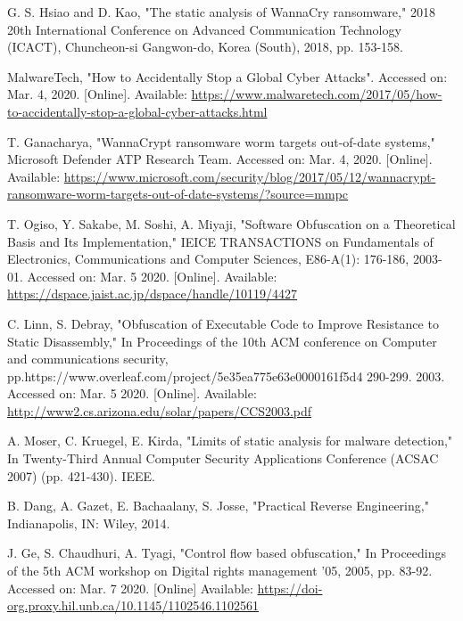 \documentclass[conference]{IEEEtran}
\begin{document}
\begin{thebibliography}{00}
 G. S. Hsiao and D. Kao, "The static analysis of WannaCry ransomware," 2018 20th International Conference on Advanced Communication Technology (ICACT), Chuncheon-si Gangwon-do, Korea (South), 2018, pp. 153-158.

 MalwareTech, "How to Accidentally Stop a Global Cyber Attacks". Accessed on: Mar. 4, 2020. [Online]. Available: \url{https://www.malwaretech.com/2017/05/how-to-accidentally-stop-a-global-cyber-attacks.html}

 T. Ganacharya, "WannaCrypt ransomware worm targets out-of-date systems," Microsoft Defender ATP Research Team. Accessed on: Mar. 4, 2020. [Online]. Available: \url{https://www.microsoft.com/security/blog/2017/05/12/wannacrypt-ransomware-worm-targets-out-of-date-systems/?source=mmpc}

 T. Ogiso, Y. Sakabe, M. Soshi, A. Miyaji, "Software Obfuscation on a Theoretical Basis and Its Implementation," IEICE TRANSACTIONS on Fundamentals of Electronics, Communications and Computer Sciences, E86-A(1): 176-186, 2003-01. Accessed on: Mar. 5 2020. [Online]. Available: \url{https://dspace.jaist.ac.jp/dspace/handle/10119/4427}

 C. Linn, S. Debray, "Obfuscation of Executable Code to Improve Resistance to
Static Disassembly," In Proceedings of the 10th ACM conference on Computer and communications security, pp.https://www.overleaf.com/project/5e35ea775e63e0000161f5d4 290-299. 2003. Accessed on: Mar. 5 2020. [Online]. Available: \url{http://www2.cs.arizona.edu/solar/papers/CCS2003.pdf}

 A. Moser, C. Kruegel, E. Kirda, "Limits of static analysis for malware detection," In Twenty-Third Annual Computer Security Applications Conference (ACSAC 2007) (pp. 421-430). IEEE.

 B. Dang, A. Gazet, E. Bachaalany, S. Josse, "Practical Reverse Engineering," Indianapolis, IN: Wiley, 2014.

 J. Ge, S. Chaudhuri, A. Tyagi, "Control flow based obfuscation," In Proceedings of the 5th ACM workshop on Digital rights management '05, 2005, pp. 83-92. Accessed on: Mar. 7 2020. [Online] Available: \url{https://doi-org.proxy.hil.unb.ca/10.1145/1102546.1102561}
  


\end{thebibliography}
\end{document}
